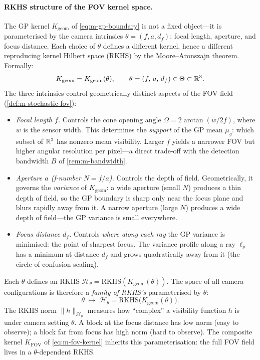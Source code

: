 \paragraph{RKHS structure of the FOV kernel space.}
The GP kernel $K_{\mathrm{geom}}$ of \cref{eq:m-gp-boundary} is not a
fixed object---it is parameterised by the camera intrinsics
$\theta = (f, a, d_f)$: focal length, aperture, and focus distance.
Each choice of $\theta$ defines a different kernel, hence a different
reproducing kernel Hilbert space (RKHS) by the Moore--Aronszajn theorem.
Formally:
\begin{equation}\label{eq:m-kernel-param}
  K_{\mathrm{geom}} = K_{\mathrm{geom}}(\theta),
  \qquad
  \theta = (f,\, a,\, d_f) \in \Theta \subset \mathbb{R}^3.
\end{equation}
The three intrinsics control geometrically distinct aspects of the FOV
field (\cref{def:m-stochastic-fov}):
\begin{itemize}[nosep]
  \item \emph{Focal length $f$.}\enspace
  Controls the cone opening angle
  $\Omega = 2\arctan(w / 2f)$, where $w$ is the sensor width.  This
  determines the \emph{support} of the GP mean $\mu_g$: which subset
  of $\mathbb{R}^3$ has nonzero mean visibility.  Larger $f$ yields a narrower
  FOV but higher angular resolution per pixel---a direct trade-off
  with the detection bandwidth $B$ of \cref{rem:m-bandwidth}.
  \item \emph{Aperture $a$ (f-number $N = f/a$).}\enspace
  Controls the depth of field.  Geometrically, it governs the
  \emph{variance} of $K_{\mathrm{geom}}$: a wide aperture (small $N$)
  produces a thin depth of field, so the GP boundary is sharp only near
  the focus plane and blurs rapidly away from it.  A narrow aperture
  (large $N$) produces a wide depth of field---the GP variance is small
  everywhere.
  \item \emph{Focus distance $d_f$.}\enspace
  Controls \emph{where along each ray} the GP variance is minimised:
  the point of sharpest focus.  The variance profile along a ray
  $\ell_p$ has a minimum at distance $d_f$ and grows quadratically
  away from it (the circle-of-confusion scaling).
\end{itemize}
Each $\theta$ defines an RKHS
$\mathcal{H}_\theta = \mathrm{RKHS}(K_{\mathrm{geom}}(\theta))$.
The space of all camera configurations is therefore a \emph{family
of RKHS's} parameterised by $\theta$:
\[
  \theta \;\mapsto\; \mathcal{H}_\theta
  = \mathrm{RKHS}\bigl(K_{\mathrm{geom}}(\theta)\bigr).
\]
The RKHS norm $\|h\|_{\mathcal{H}_\theta}$ measures how ``complex''
a visibility function $h$ is under camera setting $\theta$.  A block
at the focus distance has low norm (easy to observe); a block far
from focus has high norm (hard to observe).  The composite kernel
$K_{\mathrm{FOV}}$ of \cref{eq:m-fov-kernel} inherits this
parameterisation: the full FOV field lives in a $\theta$-dependent
RKHS.

